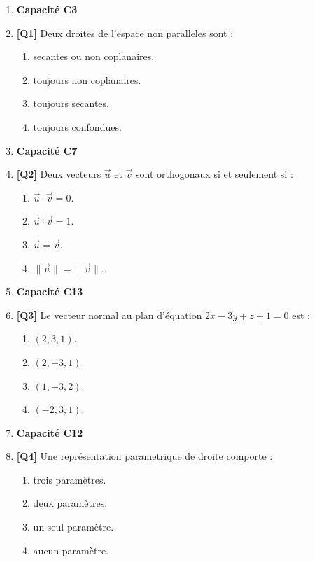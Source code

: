 \begin{enumerate}

\item[] \textbf{Capacité C3}

\item \textbf{[Q1]} Deux droites de l'espace non paralleles sont :
  \begin{enumerate}[label=\Alph*.]
    \item secantes ou non coplanaires.
    \item toujours non coplanaires.
    \item toujours secantes.
    \item toujours confondues.
  \end{enumerate}

\item[] \textbf{Capacité C7}

\item \textbf{[Q2]} Deux vecteurs $\vec{u}$ et $\vec{v}$ sont orthogonaux si et seulement si :
  \begin{enumerate}[label=\Alph*.]
    \item $\vec{u}\cdot\vec{v}=0$.
    \item $\vec{u}\cdot\vec{v}=1$.
    \item $\vec{u}=\vec{v}$.
    \item $\|\vec{u}\|=\|\vec{v}\|$.
  \end{enumerate}

\item[] \textbf{Capacité C13}

\item \textbf{[Q3]} Le vecteur normal au plan d'équation $2x-3y+z+1=0$ est :
  \begin{enumerate}[label=\Alph*.]
    \item $(2,3,1)$.
    \item $(2,-3,1)$.
    \item $(1,-3,2)$.
    \item $(-2,3,1)$.
  \end{enumerate}

\item[] \textbf{Capacité C12}

\item \textbf{[Q4]} Une représentation parametrique de droite comporte :
  \begin{enumerate}[label=\Alph*.]
    \item trois paramètres.
    \item deux paramètres.
    \item un seul paramètre.
    \item aucun paramètre.
  \end{enumerate}


\end{enumerate}
